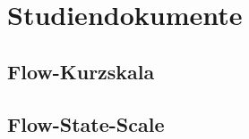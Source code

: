 

\chapter{Studiendokumente} 

\label{cha:studiendokumente}

\section{Flow-Kurzskala} 

\label{sec:flow_kurzskala}

\section{Flow-State-Scale} 

\label{sec:flow_state_scale}

